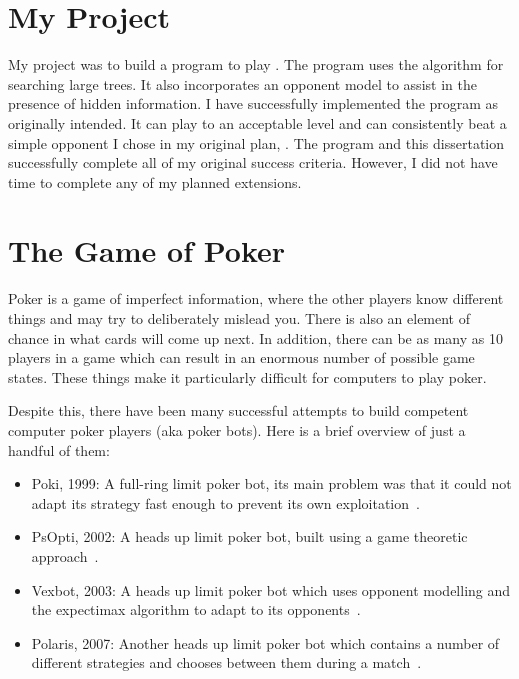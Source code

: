\section{My Project} 							%


My project was to build a program to play \texasp. The program uses the \mcts algorithm for searching large trees. It also incorporates an opponent model to assist in the presence of hidden information. I have successfully implemented the program as originally intended. It can play to an acceptable level and can consistently beat a simple opponent I chose in my original plan, \sbt. The program and this dissertation successfully complete all of my original success criteria. However, I did not have time to complete any of my planned extensions.


\section{The Game of Poker}						%



Poker is a game of imperfect information, where the other players know different things and may try to deliberately mislead you. There is also an element of chance in what cards will come up next. In addition, there can be as many as 10 players in a game which can result in an enormous number of possible game states. These things make it particularly difficult for computers to play poker. 

Despite this, there have been many successful attempts to build competent computer poker players (aka poker bots). Here is a brief overview of just a handful of them:
\begin{itemize}
\item Poki, 1999: A full-ring limit poker bot, its main problem was that it could not adapt its strategy fast enough to prevent its own exploitation~\cite{poki}.
\item PsOpti, 2002: A heads up limit poker bot, built using a game theoretic approach~\cite{psopti}.
\item Vexbot, 2003: A heads up limit poker bot which uses opponent modelling and the expectimax algorithm to adapt to its opponents~\cite{vexbot}.
\item Polaris, 2007: Another heads up limit poker bot which contains a number of different strategies and chooses between them during a match~\cite{polaris}.
\end{itemize}

